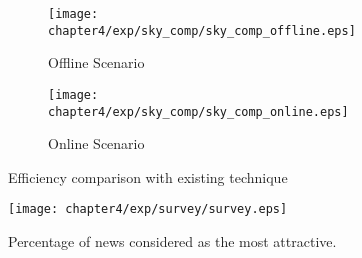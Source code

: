\begin{figure}[t]
\centering
    \begin{subfigure}[b]{0.45\textwidth}
        \texttt{[image: chapter4/exp/sky\_comp/sky\_comp\_offline.eps]}
        \caption{Offline Scenario}
    \end{subfigure}
    \begin{subfigure}[b]{0.45\textwidth}
        \texttt{[image: chapter4/exp/sky\_comp/sky\_comp\_online.eps]}
        \caption{Online Scenario}
    \end{subfigure}
\caption{Efficiency comparison with existing technique}
\label{exp:sky_comp}
\end{figure}

\begin{figure}[h]
\centering
\texttt{[image: chapter4/exp/survey/survey.eps]}
\caption{Percentage of news considered as the most attractive.}
\label{exp:survey}
\end{figure}




